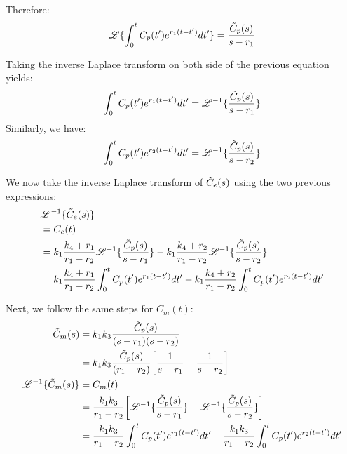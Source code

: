 \documentclass[12pt,twoside]{article}
\begin{document}
Therefore:
\begin{equation*}
\mathscr{L} \{ \int_0^t  C_p(t')  e^{r_1 (t-t')} dt' \}  = \frac{\tilde{ C }_p(s)} {s-r_1} 
\end{equation*}

Taking the inverse Laplace transform on both side of the previous equation yields:
\begin{equation*}
	\int_0^t  C_p(t')  e^{r_1 (t-t')} dt'  = \mathscr{L}^{-1} \{  \frac{\tilde{ C }_p(s)} {s-r_1} \}
\end{equation*}
Similarly, we have:
\begin{equation*}
	\int_0^t  C_p(t')  e^{r_2 (t-t')} dt'  = \mathscr{L}^{-1} \{  \frac{\tilde{ C }_p(s)} {s-r_2} \}
\end{equation*}

We now take the inverse Laplace transform of $\tilde{ C }_e(s)$ using the two previous expressions:
\begin{align*}
&	\mathscr{L}^{-1} \{ \tilde{ C }_e(s) \} \\
& 	= C_e(t) \\
& 	= k_1 \frac{k_4 + r_1}  {r_1 - r_2}  \mathscr{L}^{-1} \{\frac{\tilde{ C }_p(s)} {s - r_1} \} - k_1 \frac{k_4 + r_2}  {r_1 - r_2} \mathscr{L}^{-1} \{ \frac{\tilde{ C }_p(s)} {s - r_2} \} \\
&	= k_1 \frac{k_4 + r_1}  {r_1 - r_2}   \int_0^t  C_p(t')  e^{r_1 (t-t')} dt' - k_1 \frac{k_4 + r_2}  {r_1 - r_2} \int_0^t  C_p(t')  e^{r_2 (t-t')} dt'  \\
\end{align*}

Next, we follow the same steps for $C_m(t)$:
\noindent
\begin{align*}
  \tilde{ C }_m(s) 	&= k_1 k_3 \frac { \tilde{ C }_p(s) } {(s-r_1) (s-r_2) }  \\
  			&= k_1 k_3   \frac { \tilde{ C }_p(s) } {(r_1 - r_2) }  \bigg[ \frac{1} {s - r_1} - \frac{1} {s - r_2}  \bigg]\\
\mathscr{L}^{-1} \{ \tilde{ C }_m(s) \} &= C_m(t) \\			
&= \frac{k_1 k_3} {r_1 - r_2} \bigg[ \mathscr{L}^{-1} \{  \frac{ \tilde{ C }_p(s) } {s - r_1} \} - \mathscr{L}^{-1} \{  \frac{ \tilde{ C }_p(s) } {s - r_2}  \} \bigg]\\
&=  \frac{k_1 k_3} {r_1 - r_2}    \int_0^t  C_p(t')  e^{r_1 (t-t')} dt' -  \frac{k_1 k_3} {r_1 - r_2}   \int_0^t  C_p(t')  e^{r_2 (t-t')} dt'  \\
\end{align*}
\end{document}
